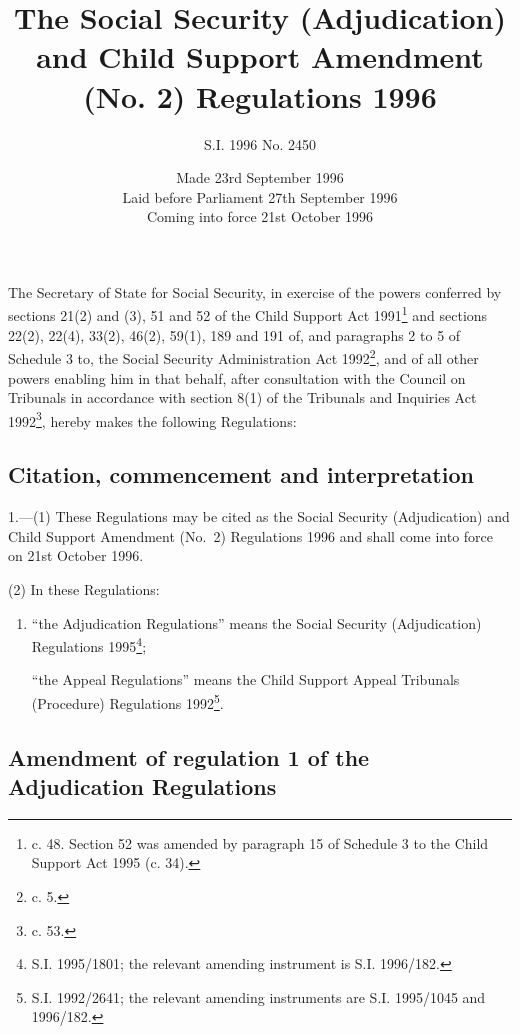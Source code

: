 \documentclass[a4paper]{article}
\title{The Social Security (Adjudication) and Child Support Amendment (No. 2) Regulations 1996}
\author{S.I. 1996 No. 2450}
\date{Made 23rd September 1996\\Laid before Parliament 27th September 1996\\Coming into force 21st October 1996}
\begin{document}
\maketitle

\noindent
The Secretary of State for Social Security, in exercise of the powers conferred by sections 21(2) and (3), 51 and 52 of the Child Support Act 1991\footnote{ c. 48. Section 52 was amended by paragraph 15 of Schedule 3 to the Child Support Act 1995 (c. 34).} and sections 22(2), 22(4), 33(2), 46(2), 59(1), 189 and 191 of, and paragraphs 2 to 5 of Schedule 3 to, the Social Security Administration Act 1992\footnote{ c. 5.}, and of all other powers enabling him in that behalf, after consultation with the Council on Tribunals in accordance with section 8(1) of the Tribunals and Inquiries Act 1992\footnote{ c. 53.}, hereby makes the following Regulations:

{\sloppy

\tableofcontents

}

\setcounter{secnumdepth}{-2}

\subsection[1. Citation, commencement and interpretation]{Citation, commencement and interpretation}

1.—(1) These Regulations may be cited as the Social Security (Adjudication) and Child Support Amendment (No.\ 2) Regulations 1996 and shall come into force on 21st October 1996.

(2) In these Regulations:
\begin{enumerate}\item[]
“the Adjudication Regulations” means the Social Security (Adjudication) Regulations 1995\footnote{\frenchspacing S.I. 1995/1801; the relevant amending instrument is S.I. 1996/182.};

“the Appeal Regulations” means the Child Support Appeal Tribunals (Procedure) Regulations 1992\footnote{\frenchspacing S.I. 1992/2641; the relevant amending instruments are S.I. 1995/1045 and 1996/182.}.
\end{enumerate}

\subsection[2. Amendment of regulation 1 of the Adjudication Regulations]{Amendment of regulation 1 of the Adjudication Regulations}
\end{document}
